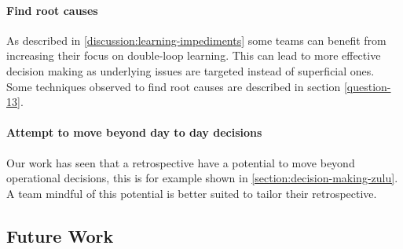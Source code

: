 \paragraph{Find root causes}
As described in \autoref{discussion:learning-impediments} some teams can benefit from increasing their focus on double-loop learning. This can lead to more effective decision making as underlying issues are targeted instead of superficial ones. Some techniques observed to find root causes are described in section \autoref{question-13}.

\paragraph{Attempt to move beyond day to day decisions}
Our work has seen that a retrospective have a potential to move beyond operational decisions, this is for example shown in \autoref{section:decision-making-zulu}. A team mindful of this potential is better suited to tailor their retrospective.


 
\subsection{Future Work}
\clearpage
